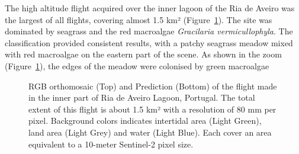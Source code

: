 \documentclass[
  number]{elsarticle}
\begin{document}
The high altitude flight acquired over the inner lagoon of the Ria de
Aveiro was the largest of all flights, covering almost 1.5 km²
(Figure~\ref{fig-Boat}). The site was dominated by seagrass and the red
macroalgae \emph{Gracilaria vermicullophyla}. The classification
provided consistent results, with a patchy seagrass meadow mixed with
red macroalgae on the eastern part of the scene. As shown in the zoom
(Figure~\ref{fig-Boat}), the edges of the meadow were colonised by green
macroalgae

\label{cell-fig-Boat}
\begin{figure}[H]


\caption{\label{fig-Boat}RGB orthomosaic (Top) and Prediction (Bottom)
of the flight made in the inner part of Ria de Aveiro Lagoon, Portugal.
The total extent of this flight is about 1.5 km² with a resolution of 80
mm per pixel. Background colors indicates intertidal area (Light Green),
land area (Light Grey) and water (Light Blue). Each cover an area
equivalent to a 10-meter Sentinel-2 pixel size.}

\end{figure}%
\end{document}
